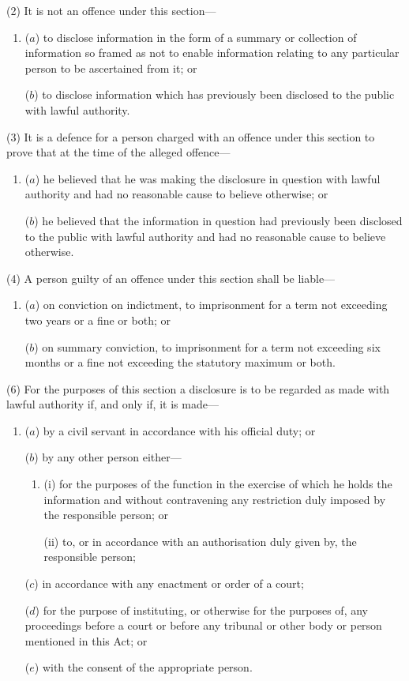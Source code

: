 \documentclass[a4paper]{article}
\begin{document}
(2) It is not an offence under this section---
\begin{enumerate}\item[]
($a$)
to disclose information in the form of a summary or collection of information so framed as not to enable information relating to any particular person to be ascertained from it; or

($b$) to disclose information which has previously been disclosed to the public
with lawful authority.
\end{enumerate}

(3)
It is a defence for a person charged with an offence under this section to prove that at the time of the alleged offence---
\begin{enumerate}\item[]
($a$) he believed that he was making the disclosure in question with lawful
authority and had no reasonable cause to believe otherwise; or

($b$) he believed that the information in question had previously been disclosed
to the public with lawful authority and had no reasonable cause to
believe otherwise.
\end{enumerate}

(4) A person guilty of an offence under this section shall be liable---
\begin{enumerate}\item[]
($a$) on conviction on indictment, to imprisonment for a term not exceeding
two years or a fine or both; or

($b$) on summary conviction, to imprisonment for a term not exceeding six
months or a fine not exceeding the statutory maximum or both.
\end{enumerate}

(6)
For the purposes of this section a disclosure is to be regarded as made with lawful authority if, and only if, it is made---
\begin{enumerate}\item[]
($a$) by a civil servant in accordance with his official duty; or

($b$) by any other person either---
\begin{enumerate}\item[]
(i)
for the purposes of the function in the exercise of which he holds the
information and without contravening any restriction duly imposed
by the responsible person; or

(ii)
to, or in accordance with an authorisation duly given by, the responsible
person;
\end{enumerate}

($c$) in accordance with any enactment or order of a court;

($d$) for the purpose of instituting, or otherwise for the purposes of, any
proceedings before a court or before any tribunal or other body or person
mentioned in this Act; or

($e$) with the consent of the appropriate person.
\end{enumerate}
\end{document}
